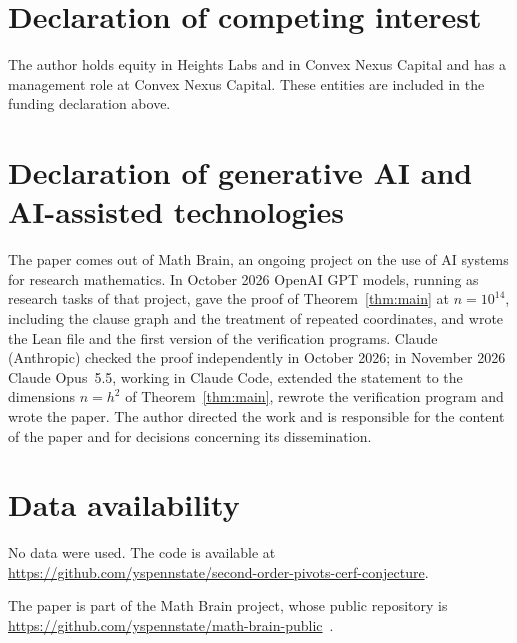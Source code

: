 \documentclass[11pt]{amsart}
\theoremstyle{definition}
\theoremstyle{remark}
\numberwithin{equation}{section}
\begin{document}
\section*{Declaration of competing interest}
The author holds equity in Heights Labs and in Convex Nexus Capital and
has a management role at Convex Nexus Capital. These entities are included
in the funding declaration above.

\section*{Declaration of generative AI and AI-assisted technologies}
The paper comes out of Math Brain, an ongoing project on the use of AI systems for research mathematics. In October 2026 OpenAI GPT models, running as research tasks of that project, gave the proof of Theorem~\ref{thm:main} at $n=10^{14}$, including the clause graph and the treatment of repeated coordinates, and wrote the Lean file and the first version of the verification programs. Claude (Anthropic) checked the proof independently in October 2026; in November 2026 Claude Opus~5.5, working in Claude Code, extended the statement to the dimensions $n=h^2$ of Theorem~\ref{thm:main}, rewrote the verification program and wrote the paper. The author directed the work and is responsible for the content of the paper and for decisions concerning its dissemination.

\section*{Data availability}
No data were used. The code is available at\\ \url{https://github.com/yspennstate/second-order-pivots-cerf-conjecture}.

The paper is part of the Math Brain project, whose public repository is \url{https://github.com/yspennstate/math-brain-public}~\cite{MathBrainRepo}.
\end{document}
